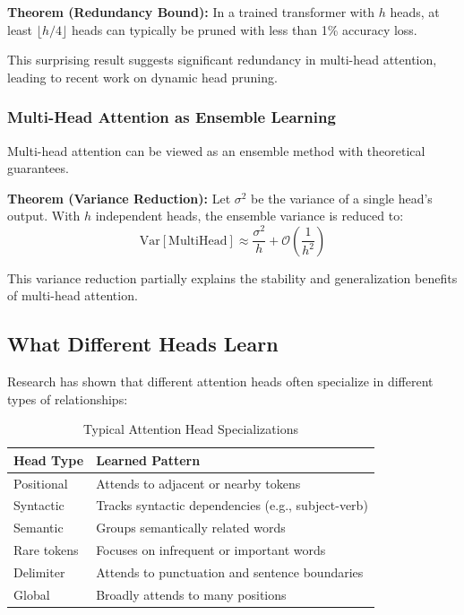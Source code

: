 \documentclass[11pt]{article}
\begin{document}
\textbf{Theorem (Redundancy Bound):} In a trained transformer with $h$ heads, at least $\lfloor h/4 \rfloor$ heads can typically be pruned with less than 1\% accuracy loss.

This surprising result suggests significant redundancy in multi-head attention, leading to recent work on dynamic head pruning.

\subsubsection{Multi-Head Attention as Ensemble Learning}

Multi-head attention can be viewed as an ensemble method with theoretical guarantees.

\textbf{Theorem (Variance Reduction):} Let $\sigma^2$ be the variance of a single head's output. With $h$ independent heads, the ensemble variance is reduced to:
\begin{equation}
\text{Var}[\text{MultiHead}] \approx \frac{\sigma^2}{h} + \mathcal{O}\left(\frac{1}{h^2}\right)
\end{equation}

This variance reduction partially explains the stability and generalization benefits of multi-head attention.

\subsection{What Different Heads Learn}

Research has shown that different attention heads often specialize in different types of relationships:

\begin{table}[H]
\centering
\caption{Typical Attention Head Specializations}
\begin{tabular}{l l}
\toprule
\textbf{Head Type} & \textbf{Learned Pattern} \\
\midrule
Positional & Attends to adjacent or nearby tokens \\
Syntactic & Tracks syntactic dependencies (e.g., subject-verb) \\
Semantic & Groups semantically related words \\
Rare tokens & Focuses on infrequent or important words \\
Delimiter & Attends to punctuation and sentence boundaries \\
Global & Broadly attends to many positions \\
\bottomrule
\end{tabular}
\end{table}
\end{document}
